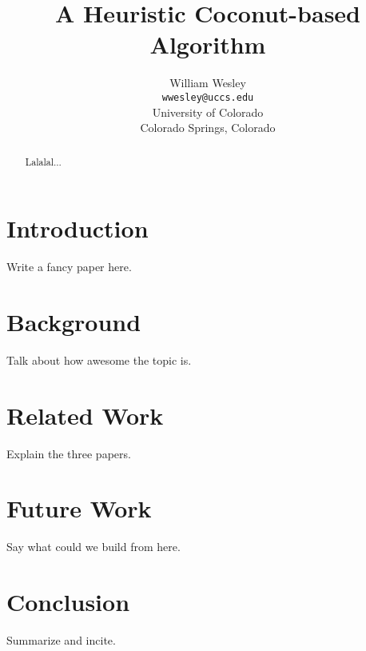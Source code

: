 \documentclass[11pt,conference]{IEEEtran}
\title{A Heuristic Coconut-based Algorithm}
\author{William Wesley \\
\texttt{wwesley@uccs.edu} \\
University of Colorado \\
Colorado Springs, Colorado}
\begin{document}
\maketitle

\begin{abstract}
Lalalal...
\end{abstract}

\section{Introduction}
Write a fancy paper here\cite{Kocher2018spectre}.
\section{Background}
Talk about how awesome the topic is.
\section{Related Work}
Explain the three papers.
\section{Future Work}
Say what could we build from here.
\section{Conclusion}
Summarize and incite.



\end{document}
